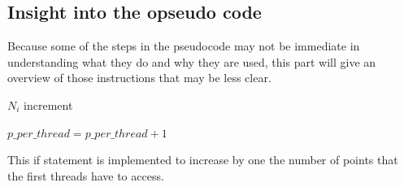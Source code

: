 \documentclass{report}
\begin{document}
\begin{minipage}[b]{0.48\textwidth}
    \subsection*{Insight into the opseudo code}
    Because some of the steps in the pseudocode may not be immediate in understanding what they do and why they are used, this part will give an overview of those instructions that may be less clear.
    \begin{algorithm}[H]
      \caption{$N_i$ increment}
      \begin{algorithmic}
          \State $p\_per\_thread = p\_per\_thread + 1$
        \EndIf
      \end{algorithmic}
    \end{algorithm}

    This if statement is implemented to increase by one the number of points that the first threads have to access.
\end{minipage}
\hspace{0.1in}
\end{document}
